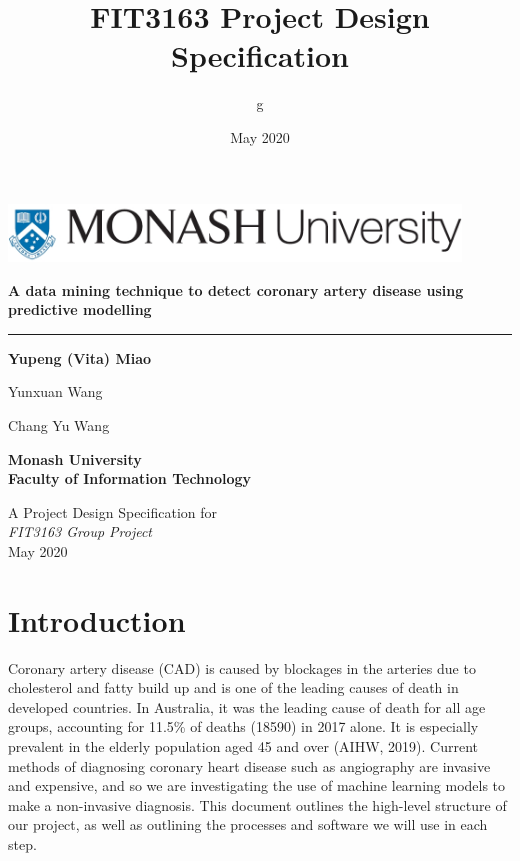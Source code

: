 \documentclass[a4paper, 12pt]{article}
\title{FIT3163 Project Design Specification}
\author{g}
\date{May 2020}
\begin{document}
\begin{titlepage}
\addtolength{\hoffset}{0cm}
	\centering
	\includegraphics[width=0.90\textwidth]{monash1line.jpg}\par\vspace{2cm}
	{\LARGE\bfseries A data mining technique to detect coronary artery disease using predictive modelling \par}
	\medskip\medskip
	\hrule
	\vspace{3cm}
	{\Large\bfseries Yupeng (Vita) Miao \par
	\medskip
	Yunxuan Wang \par
	\medskip
	Chang Yu Wang \par}
    \vspace{3cm}
    
   {\Large\bfseries Monash University\\}
    \medskip
    \large\textbf{Faculty of Information Technology\\}
    
    \vspace{3cm}
	\large A Project Design Specification for \\
	\large  \textit {FIT3163 Group Project}\\
	\vfill
	{\large  May 2020}
\end{titlepage}
\doublespacing
\tableofcontents
\pagebreak
\onehalfspacing
\section{Introduction}
Coronary artery disease (CAD) is caused by blockages in the arteries due to cholesterol and fatty build up and is one of the leading causes of death in developed countries. In Australia, it was the leading cause of death for all age groups, accounting for 11.5\% of deaths (18590) in 2017 alone. It is especially prevalent in the elderly population aged 45 and over (AIHW, 2019). Current methods of diagnosing coronary heart disease such as angiography are invasive and expensive, and so we are investigating the use of machine learning models to make a non-invasive diagnosis. This document outlines the high-level structure of our project, as well as outlining the processes and software we will use in each step.
\end{document}
